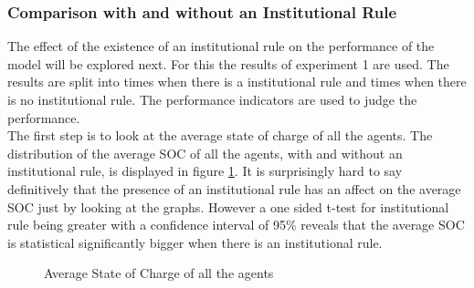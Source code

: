 \documentclass[a4paper]{article}
\begin{document}
\subsubsection{Comparison with and without an Institutional Rule}
The effect of the existence of an institutional rule on the performance of the model will be explored next. For 
this the results of experiment 1 are used. The results are split into times when there is a institutional rule and 
times when there is no institutional rule. The performance indicators are used to judge the performance. \\

The first step is to look at the average state of charge of all the agents. The distribution of the average SOC of all
the agents, with and without an institutional rule, is displayed in figure \ref{inst_averages_all_second}. It is surprisingly hard 
to say definitively that the presence of an institutional rule has an affect on the average SOC just by looking at the graphs.
However a one sided t-test for institutional rule being greater with a confidence interval of 95\% reveals that the average 
SOC is statistical significantly bigger when there is an institutional rule.
\begin{figure}[!ht]
\caption{Average State of Charge of all the agents}
\label{inst_averages_all_second}
\end{figure}
\end{document}
